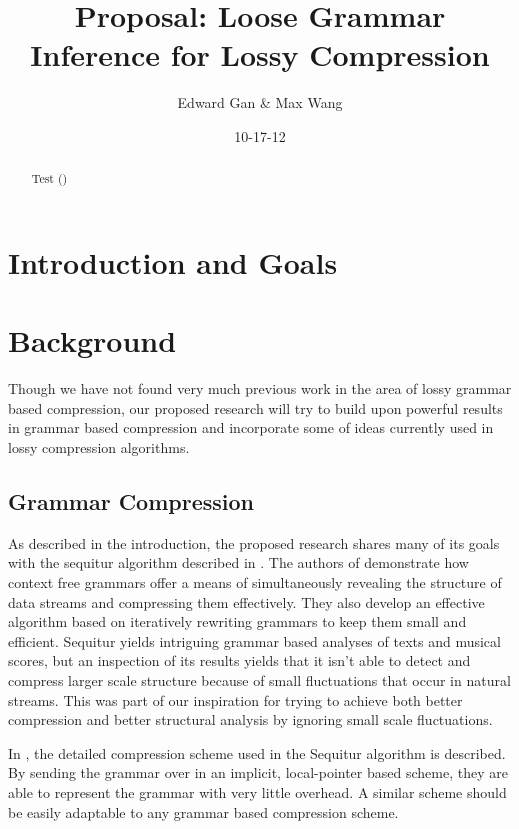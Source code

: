 \documentclass[11pt]{article}
\begin{document}


\title{Proposal: Loose Grammar Inference for Lossy Compression}
\author{Edward Gan \& Max Wang}
\date{10-17-12}
\maketitle

\begin{abstract}
Test (\cite{sequitur})
\end{abstract}

\section{Introduction and Goals}

\section{Background}

Though we have not found very much previous work in the area of lossy grammar based compression,
our proposed research will try to build upon powerful results in grammar based compression and
incorporate some of ideas currently used in lossy compression algorithms.

\subsection{Grammar Compression}

As described in the introduction, the proposed research shares many of its goals with the sequitur
algorithm described in \cite{sequitur}. The authors of \cite{sequitur} demonstrate how 
context free grammars offer a means of simultaneously revealing the structure of
data streams and compressing them effectively. They also develop an effective algorithm
based on iteratively rewriting grammars to keep them small and efficient. Sequitur
yields intriguing grammar based analyses of texts and musical scores, but an inspection of its
results yields that it isn't able to detect and compress larger scale structure because
of small fluctuations that occur in natural streams. This was part of our inspiration for
trying to achieve both better compression and better structural analysis by ignoring
small scale fluctuations.

In \cite{sequitur2}, the detailed compression scheme used in the Sequitur algorithm is described.
By sending the grammar over in an implicit, local-pointer based scheme, they are able to
represent the grammar with very little overhead. A similar scheme should be easily adaptable to any
grammar based compression scheme.
\end{document}
